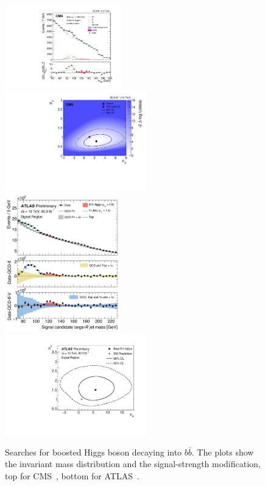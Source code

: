 \begin{figure}
  \includegraphics[width=0.45\textwidth]{figures/cms_SM_boostedH.pdf}
    \includegraphics[width=0.55\textwidth]{figures/cms_SM_fittedH.pdf} \\
  \includegraphics[width=0.45\textwidth]{figures/Hbb_ATLAS_dist.pdf}
    \includegraphics[width=0.55\textwidth]{figures/Hbb_ATLAS_fit.pdf}       
  \caption{Searches for boosted Higgs boson decaying into $b \bar b$. The plots show the invariant mass distribution and the signal-strength modification, top for CMS~\cite{Sirunyan:2017dgc}, bottom for ATLAS~\cite{ATLAS:2018hzj}.  }\label{fig:cms_boostedH}
\end{figure}

